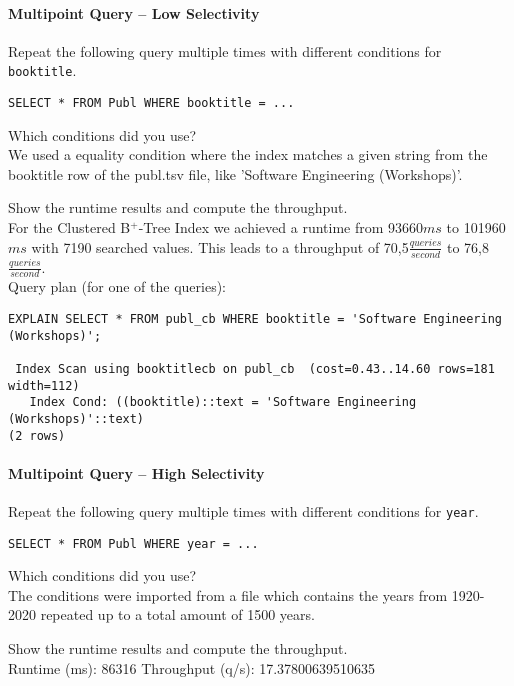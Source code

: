 \documentclass[11pt]{scrartcl}
\begin{document}
\paragraph{Multipoint Query -- Low Selectivity}

Repeat the following query multiple times with different conditions for {\tt booktitle}.

{\small
\begin{verbatim}
SELECT * FROM Publ WHERE booktitle = ...
\end{verbatim}
}

\noindent
Which conditions did you use?\\
We used a equality condition where the index matches a given string from the booktitle row of the publ.tsv file, like 'Software Engineering (Workshops)'.

\smallskip\noindent
Show the runtime results and compute the throughput.\\
For the Clustered B$^+$-Tree Index we achieved a runtime from 93660$ms$ to 101960$ms$ with 7190 searched values.
This leads to a throughput of 70,5$\frac{queries}{second}$ to 76,8$\frac{queries}{second}$.\\
\newpage
Query plan (for one of the queries):
\begin{verbatim}
EXPLAIN SELECT * FROM publ_cb WHERE booktitle = 'Software Engineering (Workshops)';

 Index Scan using booktitlecb on publ_cb  (cost=0.43..14.60 rows=181 width=112)
   Index Cond: ((booktitle)::text = 'Software Engineering (Workshops)'::text)
(2 rows)
\end{verbatim}

\paragraph{Multipoint Query -- High Selectivity}

Repeat the following query multiple times with different conditions for {\tt year}.

{\small
\begin{verbatim}
SELECT * FROM Publ WHERE year = ...
\end{verbatim}
}

\noindent
Which conditions did you use?\\
The conditions were imported from a file which contains the years from 1920-2020 repeated up to a total amount of 1500 years.

\smallskip\noindent
Show the runtime results and compute the throughput.\\
Runtime (ms): 86316
Throughput (q/s): 17.37800639510635
\end{document}

